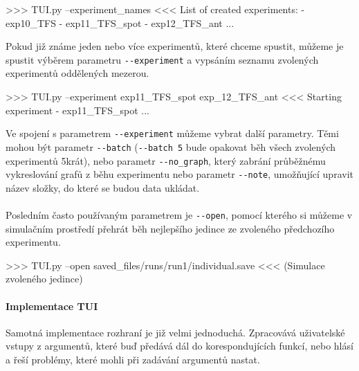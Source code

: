 \begin{code}
>>> TUI.py --experiment_names
<<< List of created experiments:
     - exp10_TFS
     - exp11_TFS_spot
     - exp12_TFS_ant
     ...
\end{code}

Pokud již známe jeden nebo více experimentů, které chceme spustit,
můžeme je spustit výběrem parametru \texttt{-{}-experiment} a vypsáním seznamu 
zvolených experimentů oddělených mezerou.

\begin{code}
>>> TUI.py --experiment exp11_TFS_spot exp_12_TFS_ant
<<< Starting experiment - exp11_TFS_spot 
    ...
\end{code}

Ve spojení s parametrem \texttt{-{}-experiment} můžeme vybrat další parametry.
Těmi mohou být parametr \texttt{-{}-batch} (\texttt{-{}-batch 5} bude
opakovat běh všech zvolených experimentů 5krát), nebo parametr
\texttt{-{}-no\_graph}, který zabrání průběžnému vykreslování grafů z běhu
experimentu nebo parametr \texttt{-{}-note}, umožňující upravit název složky,
do které se budou data ukládat.

\paragraph{}
Posledním často používaným parametrem je \texttt{-{}-open}, pomocí kterého
si můžeme v simulačním prostředí přehrát běh nejlepšího jedince ze zvoleného
předchozího experimentu.
\begin{code}
>>> TUI.py --open saved_files/runs/run1/individual.save
<<< (Simulace zvoleného jedince)
\end{code}

\paragraph{Implementace TUI}
Samotná implementace rozhraní je již velmi jednoduchá. Zpracovává uživatelské
vstupy z argumentů, které buď předává dál do korespondujících funkcí, nebo
hlásí a řeší problémy, které mohli při zadávání argumentů nastat.
